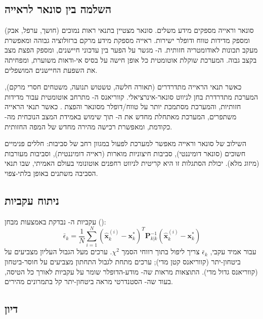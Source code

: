 \subsection{השלמה בין סונאר לראייה}
\label{sec:ch05_sonar_vision_complementarity}

סונאר וראייה מספקים מידע משלים. סונאר מצטיין בתנאי ראות נמוכים (חושך, ערפל, אבק) ומספק מדידות טווח ודופלר ישירות. ראייה מספקת מידע מרקם ברזולוציה גבוהה ומאפשרת מעקב תכונות לאודומטריה חזותית. ה- מגשר על הפער בין עדכוני חיישנים, ומספק הפצת מצב בקצב גבוה. המערכת שוקלת אוטומטית כל אופן חישה על בסיס אי-ודאות משוערת, ומפחיתה את השפעת החיישנים המושפלים.

כאשר תנאי הראייה מתדרדרים (תאורה חלשה, טשטוש תנועה, משטחים חסרי מרקם), המערכת מתדרדרת בחן לניווט סונאר-אינרציאלי. קווריאנס ה- מתרחב אוטומטית עבור מדידות חזותיות, והמערכת מסתמכת יותר על טווח/דופלר מסונאר והפצת . כאשר תנאי הראייה משתפרים, המערכת מאתחלת מחדש את ה- תוך שימוש באמידת המצב הנוכחית מה- כקודמת, ומאפשרת רכישה מהירה מחדש של המפה החזותית.

השילוב של סונאר וראייה מאפשר למערכת לפעול במגוון רחב של סביבות: חללים פנימיים חשוכים (סונאר דומיננטי), סביבות חיצוניות מוארות (ראייה דומיננטית), וסביבות מעורבות (מיזוג מלא). יכולת הסתגלות זו היא קריטית לניווט רחפנים אוטונומי בעולם האמיתי, שבו תנאי הסביבה משתנים באופן בלתי-צפוי.

\subsection{ניתוח עקביות}
\label{sec:ch05_consistency_analysis}

עקביות ה- נבדקת באמצעות מבחן  ():
\begin{equation}
\bar{\epsilon}_k = \frac{1}{N} \sum_{i=1}^N \left( \hat{\mathbf{x}}_k^{(i)} - \mathbf{x}_k^* \right)^T \mathbf{P}_{k|k}^{-1} \left( \hat{\mathbf{x}}_k^{(i)} - \mathbf{x}_k^* \right)
\label{eq:ch05_nees}
\end{equation}
עבור אמיד עקבי, $\bar{\epsilon}_k$ צריך ליפול בתוך רווחי הסמך $\chi^2$. ערכים מעל הגבול העליון מצביעים על ביטחון-יתר (קווריאנס קטן מדי); ערכים מתחת לגבול התחתון מצביעים על חוסר-ביטחון (קווריאנס גדול מדי). התוצאות מראות שה- מודע-הדופלר שומר על עקביות לאורך כל הטיסה, בעוד שה- הסטנדרטי מראה ביטחון-יתר קל בתמרונים מהירים.

\subsection{דיון}
\label{sec:ch05_discussion}

